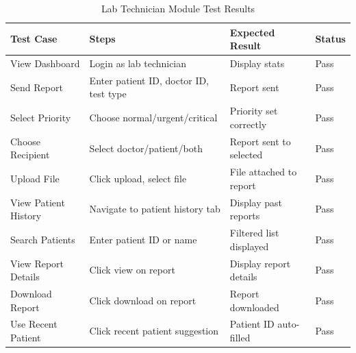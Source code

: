 \begin{table}[H]
    \centering
    \small
    \vspace{-0.5\baselineskip}
    \small

    \setlength{\tabcolsep}{2pt}
    \begin{tabular}{|p{2.5cm}|p{3.8cm}|p{2.2cm}|p{1.2cm}|}
        \hline
        \textbf{Test Case} & \textbf{Steps} & \textbf{Expected Result} & \textbf{Status} \\
        \hline
        View Dashboard & Login as lab technician & Display stats & Pass \\
        \hline
        Send Report & Enter patient ID, doctor ID, test type & Report sent & Pass \\
        \hline
        Select Priority & Choose normal/urgent/critical & Priority set correctly & Pass \\
        \hline
        Choose Recipient & Select doctor/patient/both & Report sent to selected & Pass \\
        \hline
        Upload File & Click upload, select file & File attached to report & Pass \\
        \hline
        View Patient History & Navigate to patient history tab & Display past reports & Pass \\
        \hline
        Search Patients & Enter patient ID or name & Filtered list displayed & Pass \\
        \hline
        View Report Details & Click view on report & Display report details & Pass \\
        \hline
        Download Report & Click download on report & Report downloaded & Pass \\
        \hline
        Use Recent Patient & Click recent patient suggestion & Patient ID auto-filled & Pass \\
        \hline
    \end{tabular}
    \caption{Lab Technician Module Test Results}
    \label{tab:lab-tests}
\end{table}
